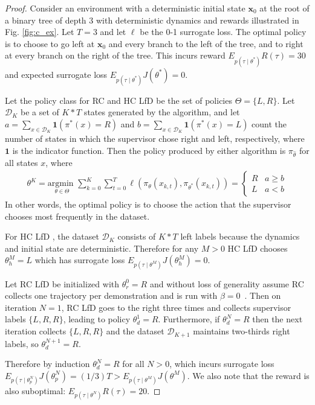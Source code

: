 \documentclass[10pt, conference]{ieeeconf}      %
\newcommand{\bx}{\mathbf{x}}
\newcommand{\mD}{\mathcal{D}}
\newcommand{\ns}{HC LfD }
\newcommand{\nc}{RC LfD }
\begin{document}
\begin{proof}
Consider an environment with a deterministic initial state $\bx_0$ at the root of a binary tree of depth 3 with deterministic dynamics and rewards illustrated in Fig. \ref{fig:c_ex}.
Let $T = 3$ and let $\ell$ be the 0-1 surrogate loss.
The optimal policy is to choose to go left at $\bx_0$ and every branch to the left of the tree, and to right at every branch on the right of the tree.
This incurs reward $E_{p(\tau \mid \theta^*)} R(\tau) = 30$ and expected surrogate loss $E_{p(\tau \mid \theta^*)} J(\theta^*) = 0$.

Let the policy class for RC and HC LfD be the set of policies $\Theta = \{L, R\}$.
Let $\mD_K$ be a set of $K * T$ states generated by the algorithm, and let $a = \sum_{x \in \mD_K} \mathbf{1}(\pi^*(x) = R)$ and $b = \sum_{x \in \mD_K} \mathbf{1}(\pi^*(x) = L)$ count the number of states in which the supervisor chose right and left, respectively, where $\mathbf{1}$ is the indicator function. 
Then the policy produced by either algorithm is $\pi_{\hat{\theta}}$ for all states $x$, where
\vspace{-2ex}
\begin{align*}
	\theta^K = \underset{\theta \in \Theta}{\text{argmin }} \sum_{k=0}^K \sum_{t=0}^T \ell(\pi_{\theta}(x_{k,t}), \pi_{\theta^*}(x_{k,t})) = \left\{ \begin{array}{cc} R & a \geq b \\ L & a < b \end{array} \right.
\end{align*}
\noindent In other words, the optimal policy is to choose the action that the supervisor chooses most frequently in the dataset.

For \ns, the dataset $\mD_K$ consists of $K * T$ left labels because the dynamics and initial state are deterministic.
Therefore for any $M > 0$  HC LfD chooses $\theta_{h}^M = L$ which has surrogate loss $E_{p(\tau \mid \theta^M)} J(\theta_{h}^M) = 0$.

Let \nc be initialized with $\theta_{r}^0 = R$ and without loss of generality assume RC collects one trajectory per demonstration and is run with $\beta=0$~\cite{ross2010reduction}.
Then on iteration $N=1$, \nc goes to the right three times and collects supervisor labels $\{L, R, R\}$, leading to policy $\theta_{d}^1 = R$.
Furthermore, if $\theta_{d}^N = R$ then the next iteration collects $\{L, R, R\}$ and the dataset $\mD_{K+1}$ maintains two-thirds right labels, so $\theta_{d}^{N+1} = R$.

Therefore by induction $\theta_{d}^{N} = R$ for all $N > 0$, which incurs surrogate loss $E_{p(\tau \mid \theta_{p}^N)} J(\theta_{p}^N) = (1 / 3) T > E_{p(\tau \mid \theta^M)} J(\theta^M)$.
We also note that the reward is also suboptimal: $E_{p(\tau \mid \theta^N)} R(\tau) = 20$.

\end{proof}
\end{document}
